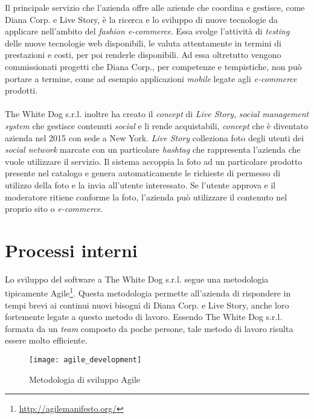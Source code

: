 Il principale servizio che l'azienda offre alle aziende che coordina e gestisce, come Diana Corp. e Live Story, è la ricerca e lo sviluppo di nuove tecnologie da applicare nell'ambito del \textit{fashion e-commerce}. Essa svolge l'attività di \textit{testing} delle nuove tecnologie web disponibili, le valuta attentamente in termini di prestazioni e costi, per poi renderle disponibili. Ad essa oltretutto vengono commissionati progetti che Diana Corp., per competenze e tempistiche, non può portare a termine, come ad esempio applicazioni \textit{mobile} legate agli \textit{e-commerce} prodotti. \\ \\
The White Dog s.r.l. inoltre ha creato il \textit{concept} di \textit{Live Story}, \textit{social management system} che gestisce contenuti \textit{social} e li rende acquistabili, \textit{concept} che è diventato azienda nel 2015 con sede a New York. \textit{Live Story} colleziona foto degli utenti dei \textit{social network} marcate con un particolare \textit{hashtag} che rappresenta l'azienda che vuole utilizzare il servizio. Il sistema accoppia la foto ad un particolare prodotto presente nel catalogo e genera automaticamente le richieste di permesso di utilizzo della foto e la invia all'utente interessato. Se l'utente approva e il moderatore ritiene conforme la foto, l'azienda può utilizzare il contenuto nel proprio sito o \textit{e-commerce}.

\section{Processi interni}

Lo sviluppo del software a The White Dog s.r.l. segue una metodologia tipicamente Agile\footnote[3]{\url{http://agilemanifesto.org/}}. Questa metodologia permette all'azienda di rispondere in tempi brevi ai continui nuovi bisogni di Diana Corp. e Live Story, anche loro fortemente legate a questo metodo di lavoro. Essendo The White Dog s.r.l. formata da un \textit{team} composto da poche persone, tale metodo di lavoro risulta essere molto efficiente.

\label{Metodologia Agile}
\begin{figure}[ht]
	\begin{center}
		\texttt{[image: agile\_development]}
		\caption{Metodologia di sviluppo Agile}
	\end{center}
\end{figure}
\FloatBarrier

